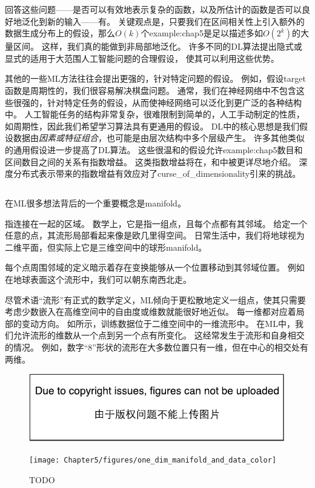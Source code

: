 回答这些问题——是否可以有效地表示复杂的函数，以及所估计的函数是否可以良好地泛化到新的输入——有。
关键观点是，只要我们在区间相关性上引入额外的数据生成分布上的假设，那么$O(k)$个\gls{example:chap5}是足以描述多如$O(2^k)$的大量区间。
这样，我们真的能做到非局部地泛化\citep{Bengio+Monperrus-2005,NIPS2005_539}。
许多不同的\gls{DL}算法提出隐式或显式的适用于大范围人工智能问题的合理假设， 使其可以利用这些优势。

其他的一些\gls{ML}方法往往会提出更强的，针对特定问题的假设。
例如，假设\gls{target}函数是周期性的，我们很容易解决棋盘问题。
通常，我们在神经网络中不包含这些很强的，针对特定任务的假设，从而使神经网络可以泛化到更广泛的各种结构中。
人工智能任务的结构非常复杂，很难限制到简单的，人工手动制定的性质，如周期性，因此我们希望学习算法具有更通用的假设。
\gls{DL}中的核心思想是我们假设数据由\emph{因素或特征组合}，也可能是由层次结构中多个层级产生。
许多其他类似的通用假设进一步提高了\gls{DL}算法。
这些很温和的假设允许\gls{example:chap5}数目和区间数目之间的关系有指数增益。
这类指数增益将在，和中被更详尽地介绍。
深度分布式表示带来的指数增益有效应对了\gls{curse_of_dimensionality}引来的挑战。


\subsection{}
\label{sec:manifold_learning}
在\gls{ML}很多想法背后的一个重要概念是\gls{manifold}。

指连接在一起的区域。
数学上，它是指一组点，且每个点都有其邻域。
给定一个任意的点，其流形局部看起来像是欧几里得空间。
日常生活中，我们将地球视为二维平面，但实际上它是三维空间中的球形\gls{manifold}。

每个点周围邻域的定义暗示着存在变换能够从一个位置移动到其邻域位置。
例如在地球表面这个流形中，我们可以朝东南西北走。

尽管术语``流形''有正式的数学定义，\gls{ML}倾向于更松散地定义一组点，使其只需要考虑少数嵌入在高维空间中的自由度或维数就能很好地近似。
每一维都对应着局部的变动方向。
如所示，训练数据位于二维空间中的一维流形中。
在\gls{ML}中，我们允许流形的维数从一个点到另一个点有所变化。
这经常发生于流形和自身相交的情况。
例如，数字``8''形状的流形在大多数位置只有一维，但在中心的相交处有两维。

\begin{figure}[!htb]
\ifOpenSource
\centerline{\includegraphics{figure.pdf}}
\else
\centerline{\texttt{[image: Chapter5/figures/one\_dim\_manifold\_and\_data\_color]}}
\fi
\caption{TODO}
\label{fig:chap5_one_dim_manifold_and_data}
\end{figure}

